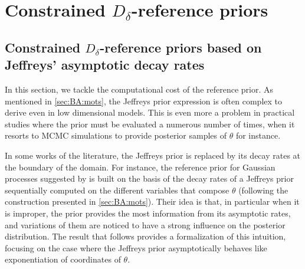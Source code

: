 \section{Constrained $D_\delta$-reference priors}\label{sec:BA:ress}





\subsection{Constrained $D_\delta$-reference priors based on Jeffreys' asymptotic decay rates}\label{sec:BA:res1}




    


    In this section, we tackle the computational cost of the reference prior. As mentioned in \cref{sec:BA:mots}, the Jeffreys prior expression is often complex to derive even in low dimensional models. This is even more a problem in practical studies where the prior must be evaluated a numerous number of times, when it resorts to MCMC simulations to provide posterior samples of $\theta$ for instance.

    In some works of the literature, the Jeffreys prior is replaced by its decay rates at the boundary of the domain. For instance, the reference prior for Gaussian processes suggested by \citet{gu_jointly_2019} is built on the basis of the decay rates of a Jeffreys prior sequentially computed on the different variables that compose $\theta$ (following the construction presented in \cref{sec:BA:mots}).
    Their idea is that, in particular when it is improper, the prior provides the most information from its asymptotic rates, and variations of them are noticed to have a strong influence on the posterior distribution.
    The result that follows provides a formalization of this intuition, focusing on the case where the Jeffreys prior asymptotically behaves like exponentiation of coordinates of $\theta$.
    
    
    
    
    
